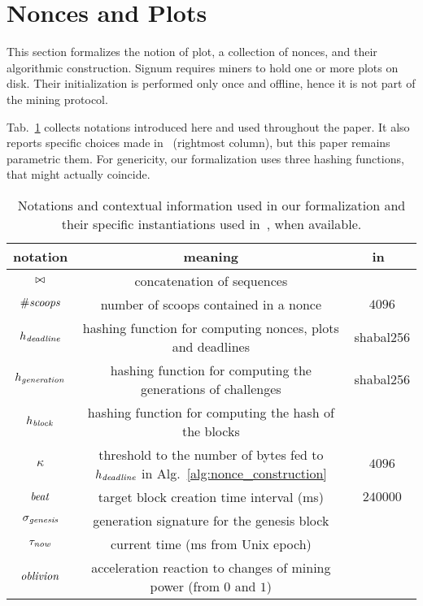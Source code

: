 \section{Nonces and Plots}\label{sec:nonces_and_plots}

This section formalizes the notion of plot, a collection of nonces, and their
algorithmic construction. Signum requires miners to hold one or more plots
on disk. Their initialization is performed only once and offline, hence it is
not part of the mining protocol.

Tab.~\ref{tab:notations} collects notations introduced here and used throughout the paper.
It also reports specific choices
made in~\cite{SignumPlotting} (rightmost column), but this paper remains parametric \wrt them.
For genericity, our formalization uses three hashing functions, that might actually coincide.

\begin{table}[t]
\begin{center}
\begin{tabular}{|c|c|c|}
  \hline
  \textbf{notation} & \textbf{meaning} & \textbf{in~\cite{SignumPlotting}}\\\hline\hline

  $\operatorname*{\bowtie}$ & concatenation of sequences & \\\hline
  ${\#\mathit{scoops}}$ & number of scoops contained in a nonce & $4096$\\\hline

  $h_{\mathit{deadline}}$ & hashing function for computing nonces, plots and deadlines & shabal256\\\hline

  $h_{\mathit{generation}}$ & hashing function for computing the generations of challenges & shabal256\\\hline

  $h_{\mathit{block}}$ & hashing function for computing the hash of the blocks & \\\hline

  $\kappa$ & threshold to the number of bytes fed to $h_{\mathit{deadline}}$ in Alg.~\ref{alg:nonce_construction} & $4096$\\\hline

  ${\mathit{beat}}$ & target block creation time interval (ms) & $240000$ \\\hline

  $\sigma_{\mathit{genesis}}$ & generation signature for the genesis block & \\\hline

  $\tau_{\mathit{now}}$ & current time (ms from Unix epoch) & \\\hline

  ${\mathit{oblivion}}$ & acceleration reaction to changes of mining power (from $0$ and $1$) & \\\hline
\end{tabular}
\end{center}
\caption{Notations and contextual information used in our formalization and their specific instantiations
  used in~\cite{SignumPlotting}, when available.}
\label{tab:notations}
\end{table}

